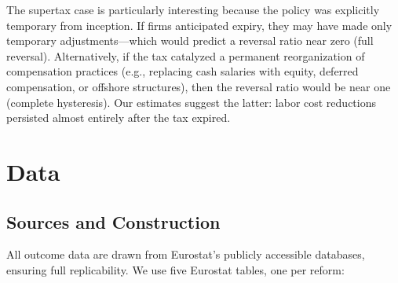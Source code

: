 \documentclass[12pt]{article}
\begin{document}
The supertax case is particularly interesting because the policy was explicitly temporary from inception. If firms anticipated expiry, they may have made only temporary adjustments---which would predict a reversal ratio near zero (full reversal). Alternatively, if the tax catalyzed a permanent reorganization of compensation practices (e.g., replacing cash salaries with equity, deferred compensation, or offshore structures), then the reversal ratio would be near one (complete hysteresis). Our estimates suggest the latter: labor cost reductions persisted almost entirely after the tax expired.


\section{Data}
\label{sec:data}

\subsection{Sources and Construction}

All outcome data are drawn from Eurostat's publicly accessible databases, ensuring full replicability. We use five Eurostat tables, one per reform:
\end{document}
